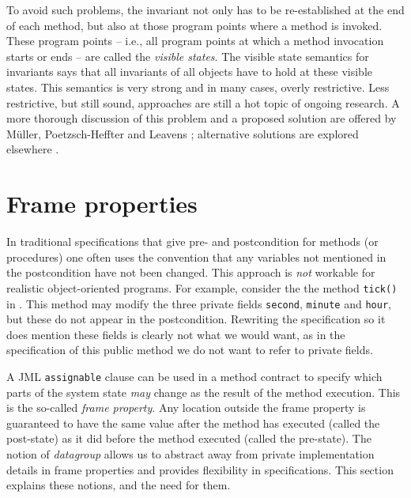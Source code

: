 \documentclass{llncs}
\begin{document}
To avoid such problems, the invariant not only has to be re-established at the
end of each method, but also at those program points where a method is invoked.
These program points -- i.e., all program points
at which a method invocation starts or ends -- are called the \emph{visible
states}. The visible state semantics for invariants says that all invariants
of all objects have to hold at these visible states.
%
This semantics is very strong and in many cases,
overly restrictive.  Less restrictive, but still sound, approaches are still a
hot topic of ongoing research. A more thorough discussion of this problem
and a proposed solution are offered by M\"{u}ller, Poetzsch-Heffter and
Leavens \cite{Mueller-Poetzsch-Heffter-Leavens05}; alternative solutions are
explored elsewhere
\cite{Huizing-Kuiper00,JacobsLeinoPiessensSchulte05,Middelkoop05}.

\section{Frame properties}
\label{Sec:assignable}

In traditional specifications that give pre- and postcondition for methods
(or procedures) one often uses the convention that any variables not mentioned 
in the postcondition have not been changed.  This approach is 
\emph{not} workable for realistic object-oriented programs.
For example, consider the the method \texttt{tick()} in 
. This method may modify the three private 
fields \texttt{second}, \texttt{minute} and \texttt{hour}, but these do 
not appear in the postcondition. Rewriting the specification so it does 
mention these fields is clearly not what we would want, as in the 
specification of this public method we do not want to refer to private fields.

A JML \texttt{assignable} clause can be used in a method contract to specify
which parts of the system state \emph{may} change as the result of the
method execution.  This is the so-called \emph{frame property}.
%
Any location outside the frame property is guaranteed to have the
same value after the method has executed (called the post-state) as it did
before the method executed (called the pre-state).
%
The notion of \emph{datagroup} allows us to abstract away from private implementation 
details in frame properties and provides flexibility in specifications.
This section explains these notions, and the need for them.
\end{document}
